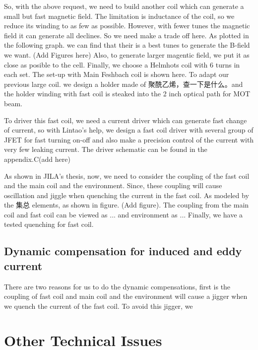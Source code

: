 So, with the above request, we need to build another coil which can generate a small but fast magnetic field. The limitation is inductance of the coil, so we reduce its winding to as few as possible. However, with fewer tunes the magnetic field it can generate all declines. So we need make a trade off here. As plotted in the following graph. we can find that their is a best tunes to generate the B-field we want. (Add Figures here) Also, to generate larger magentic field, we put it as close as posible to the cell. Finally, we choose a Helmhots coil with 6 turns in each set. The set-up with Main Feshbach coil is shown here. To adapt our previous large coil. we design a holder made of 聚酰乙烯，查一下是什么。and the holder winding with fast coil is steaked into the 2 inch optical path for MOT beam. 

To driver this fast coil, we need a current driver which can generate fast change of current, so with Lintao's help, we design a fast coil driver with several group of JFET for fast turning on-off and also make a precision control of the current with very few leaking current. The driver schematic can be found in the appendix.C(add here)

As shown in JILA's thesis, now, we need to consider the coupling of the fast coil and the main coil and the environment. Since, these coupling will cause oscillation and jiggle when quenching the current in the fast coil. As modeled by the 集总 elements, as shown in figure. (Add figure). The coupling from the main coil and fast coil can be viewed as ... and environment as ... Finally, we have a tested quenching for fast coil.



\subsection{Dynamic compensation for induced and eddy current}
There are two reasons for us to do the dynamic compensations, first is the coupling of fast coil and main coil and the environment will cause a jigger when we quench the current of the fast coil. To avoid this jigger, we 

\section{Other Technical Issues}
